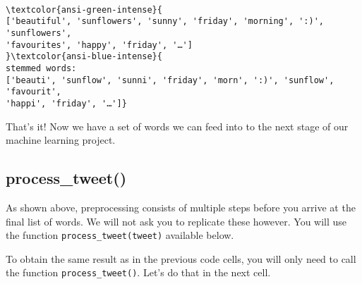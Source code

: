 \documentclass[11pt]{article}
\begin{document}
    \begin{Verbatim}[commandchars=\\\{\}]

\textcolor{ansi-green-intense}{
['beautiful', 'sunflowers', 'sunny', 'friday', 'morning', ':)', 'sunflowers',
'favourites', 'happy', 'friday', '…']
}\textcolor{ansi-blue-intense}{
stemmed words:
['beauti', 'sunflow', 'sunni', 'friday', 'morn', ':)', 'sunflow', 'favourit',
'happi', 'friday', '…']}
    \end{Verbatim}

    That's it! Now we have a set of words we can feed into to the next stage
of our machine learning project.

    \hypertarget{process_tweet}{%
\subsection{process\_tweet()}\label{process_tweet}}

As shown above, preprocessing consists of multiple steps before you
arrive at the final list of words. We will not ask you to replicate
these however. You will use the function \texttt{process\_tweet(tweet)}
available below.

To obtain the same result as in the previous code cells, you will only
need to call the function \texttt{process\_tweet()}. Let's do that in
the next cell.
\end{document}
